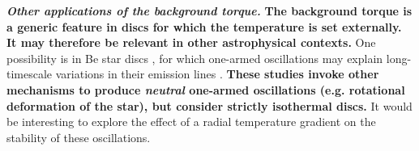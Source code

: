 {\bf\emph{Other applications of the background torque.}}     
{\bf The background torque is a generic feature in  
  discs for which the temperature is set externally.  It may therefore
  be relevant in other astrophysical contexts. }
One possibility is in Be star discs \citep{rivinius13}, 
for which one-armed oscillations may explain long-timescale variations
in their emission lines \citep[see e.g.][and references 
therein]{okasaki97,papaloizou06c,ogilvie08}. {\bf These studies 
invoke other mechanisms to produce \emph{neutral} one-armed
oscillations (e.g. rotational deformation of the star), but consider 
strictly isothermal discs.} It would be interesting to explore
the effect of a radial temperature gradient on the stability of these
oscillations. 


